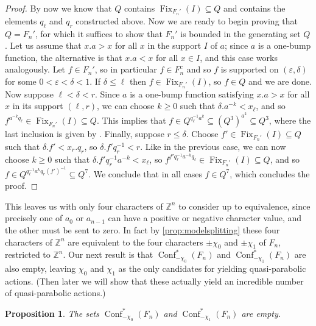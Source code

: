 \documentclass[reqno,12pt]{amsart}\setcounter{tocdepth}{1}
\newtheorem{proposition}[theorem]{Proposition}
\theoremstyle{definition}
\newcommand{\Z}{\mathbb{Z}}
\DeclareMathOperator{\Fix}{Fix}
\DeclareMathOperator{\Conf}{Conf}
\numberwithin{equation}{section}
\begin{document}
\begin{proof}
By now we know that $Q$ contains $\Fix_{F_n'}(I)\subseteq Q$ and contains the elements $q_\ell$ and $q_r$ constructed above. Now we are ready to begin proving that $Q=F_n'$, for which it suffices to show that $F_n'$ is bounded in the generating set $Q$. Let us assume that $x.a>x$ for all $x$ in the support $I$ of $a$; since $a$ is a one-bump function, the alternative is that $x.a<x$ for all $x\in I$, and this case works analogously. Let $f\in F_n'$, so in particular $f \in F_n^c$ and so $f$ is supported on $(\varepsilon,\delta)$ for some $0<\varepsilon<\delta<1$. If $\delta\le \ell$ then $f\in \Fix_{F_n'}(I)$, so $f\in Q$ and we are done. Now suppose $\ell < \delta < r$. Since $a$ is a one-bump function satisfying $x.a>x$ for all $x$ in its support $(\ell,r)$, we can choose $k\ge 0$ such that $\delta.a^{-k}<x_\ell$, and so $f^{a^{-k}q_\ell}\in \Fix_{F_n'}(I) \subseteq Q$. This implies that $f \in Q^{q_\ell^{-1} a^k} \subseteq (Q^3)^{a^k} \subseteq Q^3$, where the last inclusion is given by \StayInConf. Finally, suppose $r \le \delta$. Choose $f'\in \Fix_{F_n'}(I)\subseteq Q$ such that $\delta.f'<x_r.q_r$, so $\delta.f'q_r^{-1}<r$. Like in the previous case, we can now choose $k\ge 0$ such that $\delta.f'q_r^{-1} a^{-k}<x_\ell$, so $f^{f'q_r^{-1} a^{-k}q_\ell}\in  \Fix_{F_n'}(I) \subseteq Q$, and so $f\in Q^{q_\ell^{-1} a^k q_r (f')^{-1}} \subseteq Q^7$. We conclude that in all cases $f\in Q^7$, which concludes the proof.
\end{proof}

This leaves us with only four characters of $\Z^n$ to consider up to equivalence, since precisely one of $a_0$ or $a_{n-1}$ can have a positive or negative character value, and the other must be sent to zero. In fact by \cref{prop:modelsplitting} these four characters of $\Z^n$ are equivalent to the four characters $\pm\chi_0$ and $\pm\chi_1$ of $F_n$, restricted to $\Z^n$. Our next result is that $\Conf^\ast_{-\chi_0}(F_n)$ and $\Conf^\ast_{-\chi_1}(F_n)$ are also empty, leaving $\chi_0$ and $\chi_1$ as the only candidates for yielding quasi-parabolic actions. (Then later we will show that these actually yield an incredible number of quasi-parabolic actions.)

\begin{proposition}\label{prop:last_empty_conf}
The sets $\Conf^\ast_{-\chi_0}(F_n)$ and $\Conf^\ast_{-\chi_1}(F_n)$ are empty.
\end{proposition}
\end{document}

